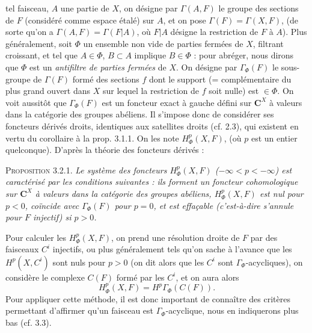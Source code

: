 
\noindent tel faisceau, $A$ une partie de $X$, on désigne par $\Gamma(A,F)$ le
groupe des sections de $F$ (considéré comme espace étalé) sur $A$, et on pose
$\Gamma(F)=\Gamma(X,F)$, (de sorte qu'on a
$\Gamma(A,F)=\Gamma(F\vert A)$, où $F\vert A$ désigne la restriction de $F$ à
$A$). Plus généralement, soit $\Phi$ un ensemble non vide de parties fermées
de $X$, filtrant croissant, et tel que $A\in\Phi$, $B\subset A$ implique
$B\in\Phi$ : pour abréger, nous dirons que $\Phi$ est un \textit{antifiltre
de parties fermées} de $X$. On désigne par $\Gamma_\Phi(F)$ le sous-groupe de
$\Gamma(F)$ formé des sections $f$ dont le support (= complémentaire du plus
grand ouvert dans $X$ sur lequel la restriction de $f$ soit nulle) est
$\in\Phi$.
On voit aussitôt que $\Gamma_\Phi(F)$ est un foncteur exact à gauche défini
sur $\mathbf C^X$ à valeurs dans la catégorie des groupes abéliens. Il s'impose donc
de considérer ses foncteurs dérivés droits, identiques aux satellites droits
(cf. 2.3), qui existent en vertu du corollaire à la prop. 3.1.1. On les note
$H^p_\Phi(X,F)$, (où $p$ est un entier quelconque). D'après la théorie des
foncteurs dérivés :

\indent\textsc{Proposition 3.2.1.} \textit{Le système des foncteurs
$H^p_\Phi(X,F)$ \textup{(}$-\infty<p<-\infty$\textup{)} est caractérisé par les conditions
suivantes : ils forment un foncteur cohomologique sur $\mathbf C^X$ à valeurs dans la
catégorie des groupes abéliens, $H^p_\Phi(X,F)$ est nul pour $p<0$, coïncide
avec $\Gamma_\Phi(F)$ pour $p=0$, et est effaçable \textup{(}c'est-à-dire s'annule pour
$F$ injectif\textup{)} si $p>0$.}

Pour calculer les $H^p_\Phi(X,F)$, on prend une résolution droite de $F$ par
des faisceaux $C^i$ injectifs, ou plus généralement tels qu'on sache à
l'avance que les $H^p(X,C^i)$ sont nuls pour $p>0$ (on dit alors que les
$C^i$ sont $\Gamma_\Phi$-acycliques), on considère le complexe $C(F)$ formé
par les $C^i$, et on aura alors
\[
H^p_\Phi(X,F)=H^p\Gamma_\Phi(C(F)).
\]
Pour appliquer cette méthode, il est donc important de connaître des critères
permettant d'affirmer qu'un faisceau est $\Gamma_\Phi$-acyclique, nous en
indiquerons plus bas (cf. 3.3).

